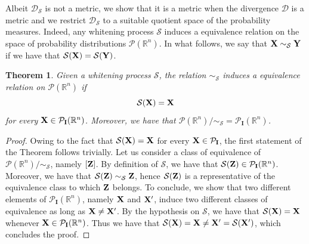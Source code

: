 \documentclass{article}
\def\DDSS{\mathcal{D}_\mathcal{S}}
\def \Id{\mathbf{I}}
\def\bZ{{\bf Z}}
\def\bX{{\bf X}}
\def\bY{{\bf Y}}
\def \PP{\mathcal{P}}
\def \simS{\sim_{\mathcal{S}}}
\def \erre{\mathbb{R}}
\newtheorem{theorem}{Theorem}
\newtheorem{remark}{Remark}
\newtheorem{proof}{Proof}
\begin{document}
% 
Albeit $\DDSS$ is not a metric, we show that it is a metric when the divergence $\mathcal{D}$ is a metric and we restrict $\DDSS$ to a suitable quotient space of the probability measures.
% 
Indeed, any whitening process $\mathcal{S}$ induces a equivalence relation on the space of probability distributions $\PP(\erre^n)$.
% 
In what follows, we say that $\bX\simS\bY$ if we have that $\mathcal{S}(\bX)=\mathcal{S}(\bY)$.


\begin{theorem}
    \label{thm:equivsims}
    Given a whitening process $\mathcal{S}$, the relation $\simS$ induces a equivalence relation on $\PP(\erre^n)$ if 
    \begin{equation}
        \label{eq:stable_whitening}
        \mathcal{S}(\bX)=\bX
    \end{equation}
    for every $\bX\in\PP_{\Id}(\erre^n)$. Moreover, we have that $\PP(\erre^n)/\simS=\PP_{\Id}(\erre^n)$.
\end{theorem}

\begin{proof}
    Owing to the fact that $\mathcal{S}(\bX)=\bX$ for every $\bX\in\PP_{\Id}$, the first statement of the Theorem follows trivially.
    Let us consider a class of equivalence of $\PP(\erre^n)/\simS$, namely $[\bZ]$.
    By definition of $\mathcal{S}$, we have that $\mathcal{S}(\bZ)\in\PP_{\Id}(\erre^n)$.
    Moreover, we have that $\mathcal{S}(\bZ)\simS\bZ$, hence $\mathcal{S}(\bZ)$ is a representative of the equivalence class to which $\bZ$ belongs.
    To conclude, we show that two different elements of $\PP_{\Id}(\erre^n)$, namely $\bX$ and $\bX'$, induce two different classes of equivalence as long as $\bX\neq\bX'$.
    By the hypothesis on $\mathcal{S}$, we have that $\mathcal{S}(\bX)=\bX$ whenever $\bX\in\PP_{\Id}(\erre^n)$.
    Thus we have that $\mathcal{S}(\bX)=\bX\neq\bX'=\mathcal{S}(\bX')$, which concludes the proof.
\end{proof}

% 



\end{document}
